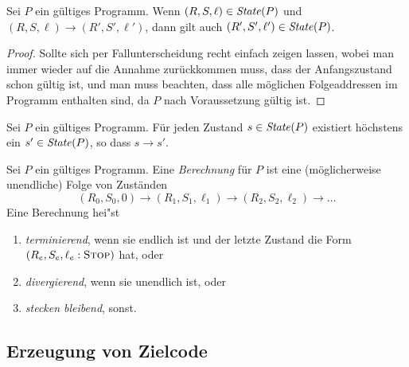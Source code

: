 \documentclass[12pt,fleqn]{article}
\begin{document}
\begin{lemma}
  Sei $P$ ein g\"ultiges Programm. Wenn $(R,S,\ell)\in{\text{\it State\/}}(P)$ und $(R,S,\ell) \to (R',S',\ell')$, dann
  gilt auch $(R',S',\ell')\in{\text{\it State\/}}(P)$.
\end{lemma}

\begin{proof}
  Sollte sich per Fallunterscheidung recht einfach zeigen lassen, wobei man immer wieder auf die Annahme zur\"uckkommen
  muss, dass der Anfangszustand schon g\"ultig ist, und man muss beachten, dass alle m\"oglichen Folgeaddressen
  im Programm enthalten sind, da $P$ nach Voraussetzung g\"ultig ist.
\end{proof}

\begin{lemma}
  Sei $P$ ein g\"ultiges Programm. F\"ur jeden Zustand $s\in{\text{\it State\/}}(P)$ existiert h\"ochstens ein $s'\in{\text{\it State\/}}(P)$, so
  dass $s \to s'$.
\end{lemma}

\begin{definition}[Berechnung]
  Sei $P$ ein g\"ultiges Programm. Eine {\em Berechnung} f\"ur $P$ ist eine (m\"oglicherweise unendliche) Folge von
  Zust\"anden
  \[
  (R_0,S_0,0) \to (R_1,S_1,\ell_1) \to (R_2,S_2,\ell_2) \to \ldots
  \]
  Eine Berechnung hei"st
  \begin{enumerate}
    \item {\em terminierend}, wenn sie endlich ist und der letzte Zustand die Form
      $(R_e,S_e,\ell_e:\textsc{Stop})$ hat, oder
    \item {\em divergierend}, wenn sie unendlich ist, oder
    \item {\em stecken bleibend}, sonst.
  \end{enumerate}
\end{definition}


\subsection{Erzeugung von Zielcode}
\end{document}
